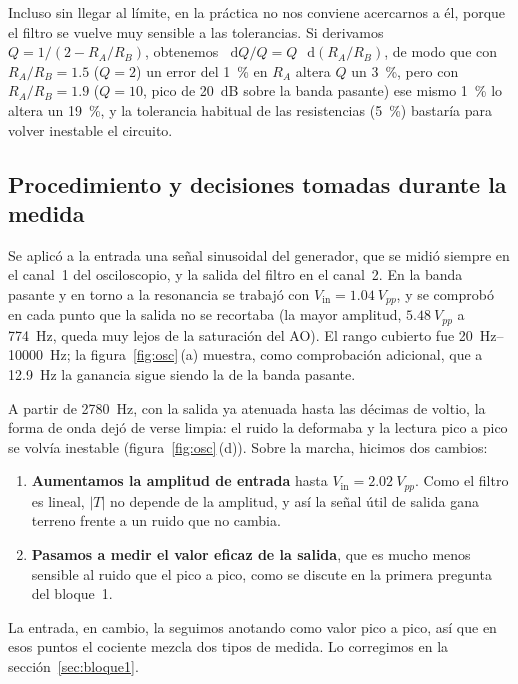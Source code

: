 \documentclass[a4paper,11pt]{article}
\newcommand{\Vin}{V_{\text{in}}}
\newcommand{\dif}{\mathop{}\!\mathrm{d}}
\begin{document}
Incluso sin llegar al límite, en la práctica no nos conviene acercarnos a él, porque el filtro se vuelve muy sensible a las tolerancias. Si derivamos $Q=1/(2-R_A/R_B)$, obtenemos $\dif Q/Q=Q\,\dif(R_A/R_B)$, de modo que con $R_A/R_B=\num{1.5}$ ($Q=2$) un error del \qty{1}{\percent} en $R_A$ altera $Q$ un \qty{3}{\percent}, pero con $R_A/R_B=\num{1.9}$ ($Q=10$, pico de \qty{20}{dB} sobre la banda pasante) ese mismo \qty{1}{\percent} lo altera un \qty{19}{\percent}, y la tolerancia habitual de las resistencias (\qty{5}{\percent}) bastaría para volver inestable el circuito.

\subsection{Procedimiento y decisiones tomadas durante la medida}

Se aplicó a la entrada una señal sinusoidal del generador, que se midió siempre en el canal~1 del osciloscopio, y la salida del filtro en el canal~2. En la banda pasante y en torno a la resonancia se trabajó con $\Vin=\qty{1.04}{V_{pp}}$, y se comprobó en cada punto que la salida no se recortaba (la mayor amplitud, $\qty{5.48}{V_{pp}}$ a \qty{774}{Hz}, queda muy lejos de la saturación del AO). El rango cubierto fue \qtyrange{20}{10000}{Hz}; la figura~\ref{fig:osc}\,(a) muestra, como comprobación adicional, que a \qty{12.9}{Hz} la ganancia sigue siendo la de la banda pasante.

A partir de \qty{2780}{Hz}, con la salida ya atenuada hasta las décimas de voltio, la forma de onda dejó de verse limpia: el ruido la deformaba y la lectura pico a pico se volvía inestable (figura~\ref{fig:osc}\,(d)). Sobre la marcha, hicimos dos cambios:
\begin{enumerate}[label=(\roman*)]
  \item \textbf{Aumentamos la amplitud de entrada} hasta $\Vin=\qty{2.02}{V_{pp}}$. Como el filtro es lineal, $|T|$ no depende de la amplitud, y así la señal útil de salida gana terreno frente a un ruido que no cambia.
  \item \textbf{Pasamos a medir el valor eficaz de la salida}, que es mucho menos sensible al ruido que el pico a pico, como se discute en la primera pregunta del bloque~1.
\end{enumerate}
La entrada, en cambio, la seguimos anotando como valor pico a pico, así que en esos puntos el cociente mezcla dos tipos de medida. Lo corregimos en la sección~\ref{sec:bloque1}.
\end{document}
